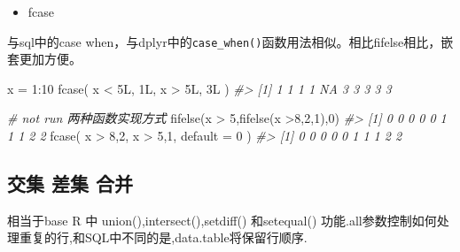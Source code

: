 \documentclass[
]{book}
\newenvironment{Shaded}{\begin{snugshade}}{\end{snugshade}}
\newcommand{\AttributeTok}[1]{\textcolor[rgb]{0.77,0.63,0.00}{#1}}
\newcommand{\CommentTok}[1]{\textcolor[rgb]{0.56,0.35,0.01}{\textit{#1}}}
\newcommand{\DecValTok}[1]{\textcolor[rgb]{0.00,0.00,0.81}{#1}}
\newcommand{\FunctionTok}[1]{\textcolor[rgb]{0.00,0.00,0.00}{#1}}
\newcommand{\NormalTok}[1]{#1}
\newcommand{\OtherTok}[1]{\textcolor[rgb]{0.56,0.35,0.01}{#1}}
\newcommand{\SpecialCharTok}[1]{\textcolor[rgb]{0.00,0.00,0.00}{#1}}
\providecommand{\tightlist}{%
  \setlength{\itemsep}{0pt}\setlength{\parskip}{0pt}}
\begin{document}
\begin{itemize}
\tightlist
\item
  fcase
\end{itemize}

与sql中的case when，与dplyr中的\texttt{case\_when()}函数用法相似。相比fifelse相比，嵌套更加方便。

\begin{Shaded}
\begin{Highlighting}[]
\NormalTok{x }\OtherTok{=} \DecValTok{1}\SpecialCharTok{:}\DecValTok{10}
\FunctionTok{fcase}\NormalTok{(}
\NormalTok{    x }\SpecialCharTok{\textless{}}\NormalTok{ 5L, 1L,}
\NormalTok{    x }\SpecialCharTok{\textgreater{}}\NormalTok{ 5L, 3L}
\NormalTok{)}
\CommentTok{\#\textgreater{}  [1]  1  1  1  1 NA  3  3  3  3  3}

\CommentTok{\# not run 两种函数实现方式}
\FunctionTok{fifelse}\NormalTok{(x }\SpecialCharTok{\textgreater{}} \DecValTok{5}\NormalTok{,}\FunctionTok{fifelse}\NormalTok{(x }\SpecialCharTok{\textgreater{}}\DecValTok{8}\NormalTok{,}\DecValTok{2}\NormalTok{,}\DecValTok{1}\NormalTok{),}\DecValTok{0}\NormalTok{)}
\CommentTok{\#\textgreater{}  [1] 0 0 0 0 0 1 1 1 2 2}
\FunctionTok{fcase}\NormalTok{(}
\NormalTok{  x }\SpecialCharTok{\textgreater{}} \DecValTok{8}\NormalTok{,}\DecValTok{2}\NormalTok{,}
\NormalTok{  x }\SpecialCharTok{\textgreater{}} \DecValTok{5}\NormalTok{,}\DecValTok{1}\NormalTok{,}
  \AttributeTok{default =} \DecValTok{0}
\NormalTok{)}
\CommentTok{\#\textgreater{}  [1] 0 0 0 0 0 1 1 1 2 2}
\end{Highlighting}
\end{Shaded}

\hypertarget{ux4ea4ux96c6-ux5deeux96c6-ux5408ux5e76}{%
\subsection{交集 差集 合并}\label{ux4ea4ux96c6-ux5deeux96c6-ux5408ux5e76}}

相当于base R 中 union(),intersect(),setdiff() 和setequal() 功能.all参数控制如何处理重复的行,和SQL中不同的是,data.table将保留行顺序.
\end{document}
